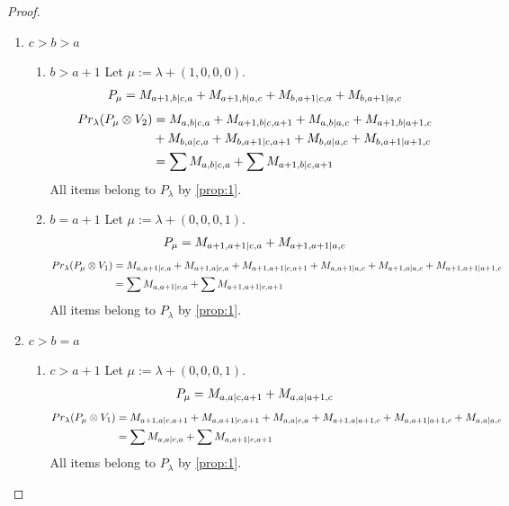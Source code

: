 \begin{proof}
\begin{enumerate}
\item $c>b>a$
  \begin{enumerate}
    \item $b>a+1$
        Let $\mu:=\lambda + (1,0,0,0) $. 
\begin{equation}\notag
  \begin{aligned}
      P_{\mu} =M_{a+1,b|c,a}
+M_{a+1,b|a,c}
+M_{b,a+1|c,a}
+M_{b,a+1|a,c}
  \end{aligned}
\end{equation}
\begin{equation}\notag
  \begin{aligned}
  Pr_{\lambda}(P_\mu \otimes V_2) &=
M_{a,b|c,a}
+M_{a+1,b|c,a+1}
+M_{a,b|a,c}
+M_{a+1,b|a+1,c} \\
                                  &+
M_{b,a|c,a}
+M_{b,a+1|c,a+1}
+M_{b,a|a,c}
+M_{b,a+1|a+1,c} \\
                                  &=
\sum M_{a,b|c,a}
+\sum M_{a+1,b|c,a+1}
  \end{aligned}
\end{equation}
All items belong to $P_\lambda$ by \cref{prop:1}.
    
\item $b=a+1$
        Let $\mu:=\lambda + (0,0,0,1) $. 
\begin{equation}\notag
  \begin{aligned}
      P_{\mu} =
M_{a+1,a+1|c,a}
+M_{a+1,a+1|a,c}
  \end{aligned}
\end{equation}
\begin{equation}\notag
  \begin{aligned}
  Pr_{\lambda}(P_\mu \otimes V_1) &=
M_{a,a+1|c,a}
+M_{a+1,a|c,a}
+M_{a+1,a+1|c,a+1}
+M_{a,a+1|a,c}
+M_{a+1,a|a,c}
+M_{a+1,a+1|a+1,c}\\
                                  &=
\sum M_{a,a+1|c,a}
+\sum M_{a+1,a+1|c,a+1}
  \end{aligned}
\end{equation}
All items belong to $P_\lambda$ by \cref{prop:1}.
  \end{enumerate}
  
\item $c>b=a$
  \begin{enumerate}
    \item $c>a+1$
        Let $\mu:=\lambda + (0,0,0,1) $. 
\begin{equation}\notag
  \begin{aligned}
      P_{\mu} =M_{a,a|c,a+1}
+M_{a,a|a+1,c}
  \end{aligned}
\end{equation}
\begin{equation}\notag
  \begin{aligned}
  Pr_{\lambda}(P_\mu \otimes V_1) &=
M_{a+1,a|c,a+1}
+M_{a,a+1|c,a+1}
+M_{a,a|c,a}
+M_{a+1,a|a+1,c}
+M_{a,a+1|a+1,c}
+M_{a,a|a,c} \\
                                  &=
\sum M_{a,a|c,a}
+\sum M_{a,a+1|c,a+1}
  \end{aligned}
\end{equation}
All items belong to $P_\lambda$ by \cref{prop:1}.


\end{enumerate}
\end{enumerate}
\end{proof}

